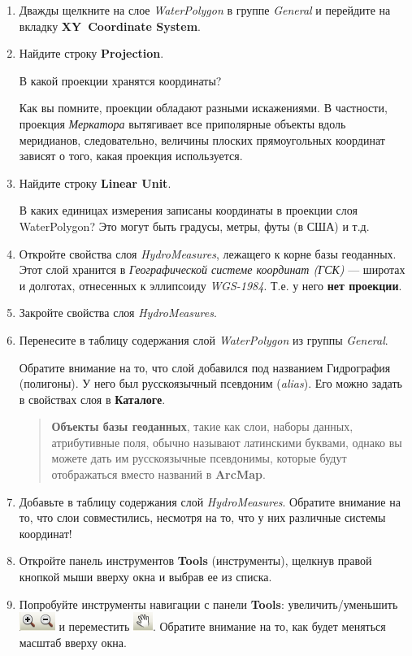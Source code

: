 \documentclass[]{book}
\theoremstyle{definition}
\theoremstyle{definition}
\theoremstyle{definition}
\theoremstyle{remark}
\begin{document}
\begin{enumerate}
\def\labelenumi{\arabic{enumi}.}
\item
  Дважды щелкните на слое \emph{WaterPolygon} в группе \emph{General} и
  перейдите на вкладку \textbf{XY~Coordinate System}.
\item
  Найдите строку \textbf{Projection}.

  В какой проекции хранятся координаты?

  Как вы помните, проекции обладают разными искажениями. В частности,
  проекция \emph{Меркатора} вытягивает все приполярные объекты вдоль
  меридианов, следовательно, величины плоских прямоугольных координат
  зависят о того, какая проекция используется.
\item
  Найдите строку \textbf{Linear Unit}.

  В каких единицах измерения записаны координаты в проекции слоя
  WaterPolygon? Это могут быть градусы, метры, футы (в США) и т.д.
\item
  Откройте свойства слоя \emph{HydroMeasures}, лежащего к корне базы
  геоданных. Этот слой хранится в \emph{Географической системе координат
  (ГСК)} --- широтах и долготах, отнесенных к эллипсоиду
  \emph{WGS-1984}. Т.е. у него \textbf{нет проекции}.
\item
  Закройте свойства слоя \emph{HydroMeasures}.
\item
  Перенесите в таблицу содержания слой \emph{WaterPolygon} из группы
  \emph{General}.

  Обратите внимание на то, что слой добавился под названием Гидрография
  (полигоны). У него был русскоязычный псевдоним (\emph{alias}). Его
  можно задать в свойствах слоя в \textbf{Каталоге}.

  \begin{quote}
  \textbf{Объекты базы геоданных}, такие как слои, наборы данных,
  атрибутивные поля, обычно называют латинскими буквами, однако вы
  можете дать им русскоязычные псевдонимы, которые будут отображаться
  вместо названий в \textbf{ArcMap}.
  \end{quote}
\item
  Добавьте в таблицу содержания слой \emph{HydroMeasures}. Обратите
  внимание на то, что слои совместились, несмотря на то, что у них
  различные системы координат!
\item
  Откройте панель инструментов \textbf{Tools} (инструменты), щелкнув
  правой кнопкой мыши вверху окна и выбрав ее из списка.
\item
  Попробуйте инструменты навигации с панели \textbf{Tools}:
  увеличить/уменьшить \includegraphics{images/Ex03/image12.png} и
  переместить \includegraphics{images/Ex03/image13.png}. Обратите
  внимание на то, как будет меняться масштаб вверху окна.


\end{enumerate}
\end{document}
